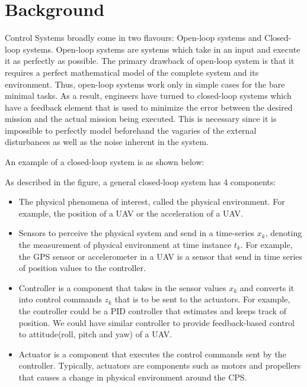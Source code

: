 \section{Background}
Control Systems broadly come in two flavours: Open-loop systems and Closed-loop systems. Open-loop systems are systems which take in an input and execute it as perfectly as possible. The primary drawback of open-loop system is that it requires a perfect mathematical model of the complete system and its environment. Thus, open-loop systems work only in simple cases for the bare minimal tasks.  As a result, engineers have turned to closed-loop systems which have a feedback element that is used to minimize the error between the desired mission and the actual mission being executed. This is necessary since it is impossible to perfectly model beforehand the vagaries of the external disturbances as well as the noise inherent in the system.

An example of a closed-loop system is as shown below:


As described in the figure, a general closed-loop system has 4 components:

\begin{itemize}
	\item The physical phenomena of interest, called the physical environment. For example, the position of a UAV or the acceleration of a UAV.
	\item Sensors to perceive the physical system and send in a time-series $x_k$, denoting the measurement of physical environment at time instance $t_k$. For example, the GPS sensor or accelerometer in a UAV is a sensor that send in time series of position values to the controller.
	\item Controller is a component that takes in the sensor values $x_k$ and converts it into control commands $z_k$ that is to be sent to the actuators. For example, the controller could be a PID controller that estimates and keeps track of position. We could have similar controller to provide feedback-based control to attitude(roll, pitch and yaw) of a UAV.  
	\item Actuator is a component that executes the control commands sent by the controller. Typically, actuators are components such as motors and propellers that causes a change in physical environment around the CPS.

\end{itemize}

